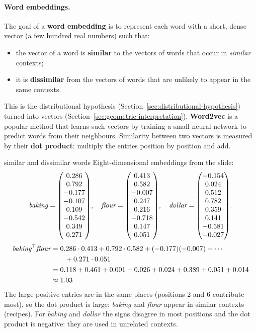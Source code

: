 \paragraph{Word embeddings.}
The goal of a \textbf{word embedding} is to represent each word with a short, dense
vector (a few hundred real numbers) such that:
\begin{itemize}[nosep]
  \item the vector of a word is \textbf{similar} to the vectors of words that occur in
        \emph{similar} contexts;
  \item it is \textbf{dissimilar} from the vectors of words that are unlikely to appear
        in the same contexts.
\end{itemize}
This is the distributional hypothesis (Section~\ref{sec:distributional-hypothesis})
turned into vectors (Section~\ref{sec:geometric-interpretation}). \textbf{Word2vec} is
a popular method that learns such vectors by training a small neural network to
predict words from their neighbours. Similarity between two vectors is measured by
their \textbf{dot product}: multiply the entries position by position and add.

\begin{nbexample}{similar and dissimilar words}
Eight-dimensional embeddings from the slide:
\[
  \textit{baking} = \begin{pmatrix}0.286\\0.792\\-0.177\\-0.107\\0.109\\-0.542\\0.349\\0.271\end{pmatrix}\!,\quad
  \textit{flour}  = \begin{pmatrix}0.413\\0.582\\-0.007\\0.247\\0.216\\-0.718\\0.147\\0.051\end{pmatrix}\!,\quad
  \textit{dollar} = \begin{pmatrix}-0.154\\0.024\\0.512\\0.782\\0.359\\0.141\\-0.581\\-0.027\end{pmatrix}\!.
\]
\begin{align*}
  \textit{baking}^{\top}\textit{flour}
  &= 0.286 \cdot 0.413 + 0.792 \cdot 0.582 + (-0.177)(-0.007) + \cdots\\
  &\qquad + 0.271 \cdot 0.051\\
  &= 0.118 + 0.461 + 0.001 - 0.026 + 0.024 + 0.389 + 0.051 + 0.014\\
  &\approx 1.03
\end{align*}
The large positive entries are in the same places (positions 2 and 6 contribute most),
so the dot product is large: \emph{baking} and \emph{flour} appear in similar contexts
(recipes). For \emph{baking} and \emph{dollar} the signs disagree in most positions and
the dot product is negative: they are used in unrelated contexts.
\end{nbexample}

